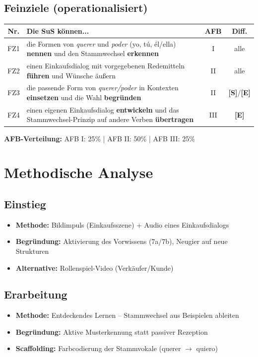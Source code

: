 \documentclass[11pt,a4paper]{article}
\newcommand{\Std}{\textcolor{standard}{\textbf{[S]}}}
\newcommand{\E}{\textcolor{erweiterung}{\textbf{[E]}}}
\begin{document}
\subsection{Feinziele (operationalisiert)}
\begin{tabular}{|c|p{7.5cm}|c|c|}
\hline
\textbf{Nr.} & \textbf{Die SuS können...} & \textbf{AFB} & \textbf{Diff.} \\
\hline
FZ1 & die Formen von \textit{querer} und \textit{poder} (yo, tú, él/ella) \textbf{nennen} und den Stammwechsel \textbf{erkennen} & I & alle \\
\hline
FZ2 & einen Einkaufsdialog mit vorgegebenen Redemitteln \textbf{führen} und Wünsche äußern & II & alle \\
\hline
FZ3 & die passende Form von \textit{querer/poder} in Kontexten \textbf{einsetzen} und die Wahl \textbf{begründen} & II & \Std{}/\E{} \\
\hline
FZ4 & einen eigenen Einkaufsdialog \textbf{entwickeln} und das Stammwechsel-Prinzip auf andere Verben \textbf{übertragen} & III & \E{} \\
\hline
\end{tabular}

\vspace{1em}
\textbf{AFB-Verteilung:} AFB I: 25\% | AFB II: 50\% | AFB III: 25\%

\section{Methodische Analyse}

\subsection{Einstieg}
\begin{itemize}
    \item \textbf{Methode:} Bildimpuls (Einkaufsszene) + Audio eines Einkaufsdialogs
    \item \textbf{Begründung:} Aktivierung des Vorwissens (7a/7b), Neugier auf neue Strukturen
    \item \textbf{Alternative:} Rollenspiel-Video (Verkäufer/Kunde)
\end{itemize}

\subsection{Erarbeitung}
\begin{itemize}
    \item \textbf{Methode:} Entdeckendes Lernen -- Stammwechsel aus Beispielen ableiten
    \item \textbf{Begründung:} Aktive Musterkennung statt passiver Rezeption
    \item \textbf{Scaffolding:} Farbcodierung der Stammvokale (qu\textcolor{fach}{e}rer $\rightarrow$ qu\textcolor{fach}{ie}ro)
\end{itemize}
\end{document}
